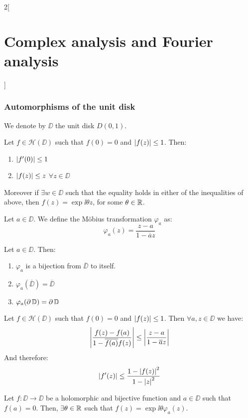 \documentclass[../../../main.tex]{subfiles}
\begin{document}
\begin{multicols}{2}[\section{Complex analysis and Fourier analysis}]
  \subsubsection{Automorphisms of the unit disk}
  \begin{definition}
    We denote by $\DD$ the unit disk $D(0,1)$.
  \end{definition}
  \begin{lemma}
    Let $f\in\mathcal{H}(\DD)$ such that $f(0)=0$ and $\abs{f(z)}\leq 1$. Then:
    \begin{enumerate}
      \item $\abs{f'(0)}\leq 1$
      \item $\abs{f(z)}\leq z$ $\forall z\in \DD$
    \end{enumerate}
    Moreover if $\exists w\in \DD$ such that the equality holds in either of the inequalities of above, then $f(z)=\exp{\ii \theta} z$, for some $\theta\in\mathbb{R}$.
  \end{lemma}
  \begin{definition}
    Let $a\in \DD$. We define the Möbius transformation $\varphi_a$ as: $$\varphi_a(z)=\frac{z-a}{1-\overline{a}z}$$
  \end{definition}
  \begin{proposition}
    Let $a\in \DD$. Then:
    \begin{enumerate}
      \item $\varphi_a$ is a bijection from $\overline{\DD}$ to itself.
      \item $\varphi_a(\overline{\DD})=\overline{\DD}$
      \item $\varphi_a(\operatorname{\partial}{\mathbb{D}})=\operatorname{\partial}{\mathbb{D}}$
    \end{enumerate}
  \end{proposition}
  \begin{lemma}
    Let $f\in\mathcal{H}(\DD)$ such that $f(0)=0$ and $\abs{f(z)}\leq 1$. Then $\forall a,z\in \DD$ we have:
    $$\abs{\frac{f(z)-f(a)}{1-\overline{f(a)}f(z)}}\leq\abs{\frac{z-a}{1-\overline{a}z}}$$
    And therefore: $$\abs{f'(z)}\leq\frac{1-{\abs{f(z)}}^2}{1-{\abs{z}}^2}$$
  \end{lemma}
  \begin{theorem}
    Let $f:\DD\rightarrow \DD$ be a holomorphic and bijective function and $a\in \DD$ such that $f(a)=0$. Then, $\exists\theta\in\mathbb{R}$ such that $f(z)=\exp{\ii \theta} \varphi_a(z)$.
  \end{theorem}

\end{multicols}
\end{document}
